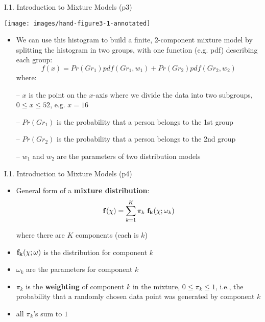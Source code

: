 \documentclass[handout]{beamer}
\newcommand{\strong}[1]{\textbf{\color{teal} #1}}
\newcommand{\stronger}[1]{\textbf{\color{purple} #1}}
\begin{document}
\begin{frame}{I.1. Introduction to Mixture Models (p3)}
\begin{center}
\texttt{[image: images/hand-figure3-1-annotated]}\\
\end{center}
\begin{itemize}
\item We can use this histogram to build a finite, 2-component mixture model by splitting the histogram in two groups, with one function (e.g. pdf) describing each group:
\[
	f(x) = Pr(Gr_1) pdf(Gr_1,w_1) + Pr(Gr_2) pdf(Gr_2,w_2)
\]
{\small where:}
\item[--] {\small $x$ is the point on the $x$-axis where we divide the data into two subgroups, $0 \le x \le 52$, e.g. $x=16$}
\item[--] {\small $Pr(Gr_1)$ is the probability that a person belongs to the 1st group}
\item[--] {\small $Pr(Gr_2)$ is the probability that a person belongs to the 2nd group}
\item[--] {\small $w_1$ and $w_2$ are the parameters of two distribution models}
\end{itemize}
\end{frame}
\begin{frame}{I.1. Introduction to Mixture Models (p4)}
\begin{itemize}
\item General form of a \stronger{mixture distribution}:
\[
	{\bf f}(\chi) = \sum_{k=1}^{K} \pi_k ~ {\bf f_k}( \chi; \omega_k )
\]
\item[] where there are $K$ components (each is $k$)
\item ${\bf f_k}( \chi; \omega )$ is the distribution for component $k$
\item $\omega_k$ are the parameters for component $k$
\item $\pi_k$ is the \strong{weighting} of component $k$ in the mixture, $0 \le \pi_k \le 1$, i.e., the probability that a randomly chosen data point was generated by component $k$
\item all $\pi_k$'s sum to $1$
\end{itemize}
\end{frame}
\end{document}

